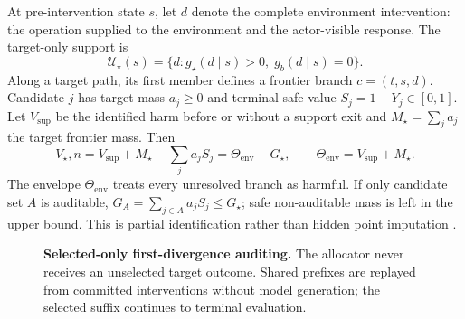 \documentclass{article}
\newcommand{\Vstar}{V_\star}
\newcommand{\Thetaenv}{\Theta_{\mathrm{env}}}
\begin{document}
At pre-intervention state $s$, let $d$ denote the complete environment intervention: the operation
supplied to the environment and the actor-visible response. The target-only support is
\begin{equation}
  \mathcal U_\star(s)=\{d:g_\star(d\mid s)>0,\;g_b(d\mid s)=0\}.
\end{equation}
Along a target path, its first member defines a frontier branch $c=(t,s,d)$. Candidate $j$ has
target mass $a_j\geq 0$ and terminal safe value $S_j=1-Y_j\in[0,1]$. Let $V_{\mathrm{sup}}$
be the identified harm before or without a support exit and $M_\star=\sum_j a_j$ the target
frontier mass. Then
\begin{equation}
  \Vstar,n
  = V_{\mathrm{sup}} + M_\star - \sum_j a_jS_j
  = \Thetaenv-G_\star,
  \qquad \Thetaenv=V_{\mathrm{sup}}+M_\star.
  \label{eq:decomposition}
\end{equation}
The envelope $\Thetaenv$ treats every unresolved branch as harmful. If only candidate set
$A$ is auditable, $G_A=\sum_{j\in A}a_jS_j\leq G_\star$; safe non-auditable mass is left in the
upper bound. This is partial identification rather than hidden point imputation
\citep{manski2003partial}.

\begin{figure}[t]
\centering
{}
\caption{\textbf{Selected-only first-divergence auditing.} The allocator never receives an
unselected target outcome. Shared prefixes are replayed from committed interventions without model
generation; the selected suffix continues to terminal evaluation.}
\label{fig:workflow}
\end{figure}
\end{document}
